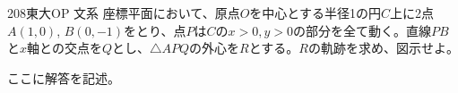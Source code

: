 \begin{prob}{208}{}{東大OP 文系}
 座標平面において、原点$O$を中心とする半径1の円$C$上に2点$A(1,0)$, $B(0,-1)$をとり、点$P$は$C$の$x>0, y>0$の部分を全て動く。直線$PB$と$x$軸との交点を$Q$とし、$\triangle{APQ}$の外心を$R$とする。$R$の軌跡を求め、図示せよ。
\end{prob}
ここに解答を記述。